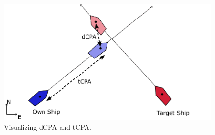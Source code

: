\begin{figure}
    \centering
    \includegraphics[width=\textwidth]{Images/shipCPA.pdf}
    \caption{Visualizing dCPA and tCPA.}
    \label{FIG: ship CPA}
\end{figure}





